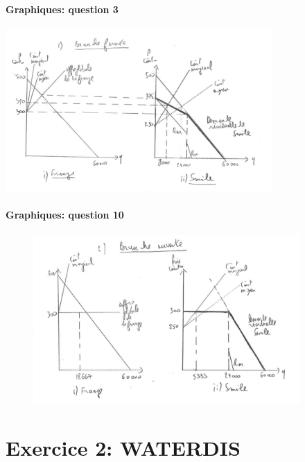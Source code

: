 \documentclass[notes, ignorenonframetext, compress, 9pt, xcolor=svgnames, aspectratio=169]{beamer}
\begin{document}
  \begin{frame}[allowframebreaks]{\insertsection}
   \framesubtitle{Graphiques: question 3}
   \begin{center}
   \includegraphics[width=4in]{figq3.png}
   \end{center}
   \end{frame}
   
   \begin{frame}[allowframebreaks]{\insertsection}
   \framesubtitle{Graphiques:  question 10}
   \begin{figure}
   \begin{center}
   \includegraphics[width=4in]{figq10.png}
   \end{center}
   \end{figure}
   \end{frame}
   
 \section{Exercice 2:  WATERDIS}
 \frame{\sectionpage}
 
\end{document}
